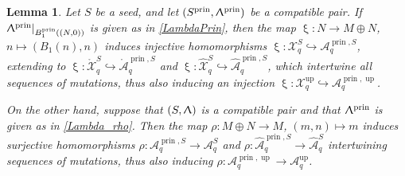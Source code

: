 \documentclass{amsart}
\DeclareMathOperator{\prin}{prin}
\DeclareMathOperator{\up}{up}
\let\rar=\rightarrow
\let\s=\mathcal
\let\wh=\widehat
\let\mr=\mathring
\renewcommand{\xi}{\upxi}
\renewcommand{\Lambda}{\Uplambda}
\theoremstyle{plain}%
\newtheorem{lem}[thm]{Lemma}
\theoremstyle{definition}
\theoremstyle{remark}
\begin{document}
\begin{lem}\label{xirho}
Let $S$ be a seed, and let $(S^{\prin},\Lambda^{\prin})$ be a compatible pair.   If $\Lambda^{\prin}|_{B^{\prin}_{1}((N,0))}$ is given as in \eqref{LambdaPrin}, then the map $\xi\colon N\rar M\oplus N$, $n\mapsto (B_1(n),n)$ induces injective homomorphisms $\xi\colon {\s{X}}^{S}_q\hookrightarrow {\s{A}}_q^{\prin,S}$, extending to $\xi\colon \mr{\s{X}}^{S}_q\hookrightarrow \mr{\s{A}}_q^{\prin,S}$ and $\xi\colon \wh{\s{X}}^{S}_q\hookrightarrow \wh{\s{A}}_q^{\prin,S}$, which intertwine all sequences of mutations, thus also inducing an injection $\xi\colon \s{X}^{\up}_q\hookrightarrow \s{A}_q^{\prin,\up}$. 

On the other hand, suppose that $(S,\Lambda)$ is a compatible pair and that $\Lambda^{\prin}$ is given as in \eqref{Lambda_rho}.  Then the map $\rho\colon M\oplus N\rar M$, $(m,n)\mapsto m$ induces surjective homomorphisms $\rho\colon {\s{A}}_q^{\prin,S}\rar {\s{A}}_q^{S}$ and $\rho\colon \wh{\s{A}}_q^{\prin,S}\rar \wh{\s{A}}_q^{S}$ intertwining sequences of mutations, thus also inducing $\rho\colon \s{A}_q^{\prin,\up}\rar \s{A}_q^{\up}$.
\end{lem} 
\end{document}
